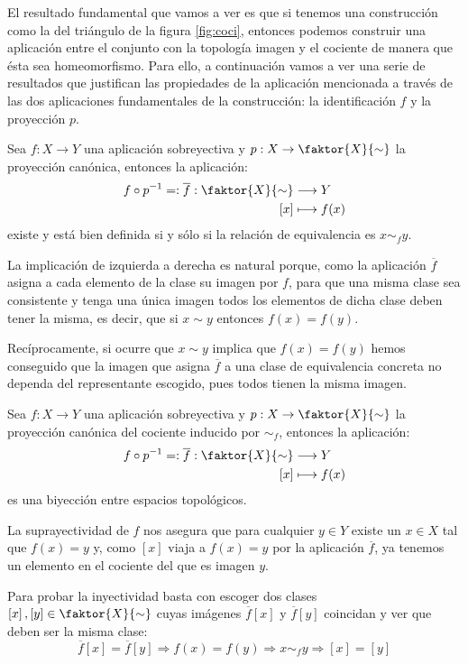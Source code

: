 El resultado fundamental que vamos a ver es que si tenemos una construcción como la del triángulo de la figura \ref{fig:coci}, entonces podemos construir una aplicación entre el conjunto con la topología imagen y el cociente de manera que ésta sea homeomorfismo. Para ello, a continuación vamos a ver una serie de resultados que justifican las propiedades de la aplicación mencionada a través de las dos aplicaciones fundamentales de la construcción: la identificación $f$ y la proyección $p$.

\begin{prop}
Sea $f: X \rightarrow Y$ una aplicación sobreyectiva y $p: X \rightarrow \faktor{X}{\sim}$ la proyección canónica, entonces la aplicación:
\begin{align*}
f\circ p^{-1} =: \overline{f} : \faktor{X}{\sim} & \longrightarrow Y \\
 			  [x] & \longmapsto f(x)
\end{align*}
existe y está bien definida si y sólo si la relación de equivalencia es $x\sim_f y$.
\end{prop}
\begin{demo}
La implicación de izquierda a derecha es natural porque, como la aplicación $\overline{f}$ asigna a cada elemento de la clase su imagen por $f$, para que una misma clase sea consistente y tenga una única imagen todos los elementos de dicha clase deben tener la misma, es decir, que si $x\sim y$ entonces $f(x) = f(y)$.

Recíprocamente, si ocurre que $x\sim y$ implica que $f(x) = f(y)$ hemos conseguido que la imagen que asigna $\overline{f}$ a una clase de equivalencia concreta no dependa del representante escogido, pues todos tienen la misma imagen.
\end{demo}

\begin{prop}
Sea $f: X \rightarrow Y$ una aplicación sobreyectiva y $p: X \rightarrow \faktor{X}{\sim}$ la proyección canónica del cociente inducido por $\sim_f$, entonces la aplicación:
\begin{align*}
f\circ p^{-1} =: \overline{f} : \faktor{X}{\sim} & \longrightarrow Y \\
 			  [x] & \longmapsto f(x)
\end{align*}
es una biyección entre espacios topológicos.
\end{prop}
\begin{demo}
La suprayectividad de $f$ nos asegura que para cualquier $y \in Y$ existe un $x\in X$ tal que $f(x) = y$ y, como $[x]$ viaja a $f(x)=y$ por la aplicación $\overline{f}$, ya tenemos un elemento en el cociente del que es imagen $y$.

Para probar la inyectividad basta con escoger dos clases $\left[ x \right], \left[ y \right] \in \faktor{X}{\sim}$ cuyas imágenes $\overline{f}\left[ x \right]$ y $\overline{f}\left[ y \right]$ coincidan y ver que deben ser la misma clase:
\[
\overline{f}\left[ x \right]=\overline{f}\left[ y \right] \Rightarrow f(x) = f(y) \Rightarrow x \sim_f y \Rightarrow [x] = [y]
\]
\end{demo}

